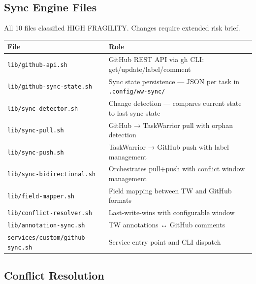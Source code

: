 \documentclass[
]{article}
\newcounter{none} %
\begin{document}
\subsection{Sync Engine Files}\label{sync-engine-files}

All 10 files classified HIGH FRAGILITY. Changes require extended risk
brief.

{\def\LTcaptype{none} %
\begin{longtable}[]{@{}
  >{\raggedright\arraybackslash}p{}
  >{\raggedright\arraybackslash}p{}@{}}
\toprule\noalign{}
\begin{minipage}[b]{\linewidth}\raggedright
File
\end{minipage} & \begin{minipage}[b]{\linewidth}\raggedright
Role
\end{minipage} \\
\midrule\noalign{}
\endhead
\bottomrule\noalign{}
\endlastfoot
\texttt{lib/github-api.sh} & GitHub REST API via gh CLI:
get/update/label/comment \\
\texttt{lib/github-sync-state.sh} & Sync state persistence --- JSON per
task in \texttt{.config/ww-sync/} \\
\texttt{lib/sync-detector.sh} & Change detection --- compares current
state to last sync state \\
\texttt{lib/sync-pull.sh} & GitHub → TaskWarrior pull with orphan
detection \\
\texttt{lib/sync-push.sh} & TaskWarrior → GitHub push with label
management \\
\texttt{lib/sync-bidirectional.sh} & Orchestrates pull+push with
conflict window management \\
\texttt{lib/field-mapper.sh} & Field mapping between TW and GitHub
formats \\
\texttt{lib/conflict-resolver.sh} & Last-write-wins with configurable
window \\
\texttt{lib/annotation-sync.sh} & TW annotations ↔ GitHub comments \\
\texttt{services/custom/github-sync.sh} & Service entry point and CLI
dispatch \\
\end{longtable}
}

\subsection{Conflict Resolution}\label{conflict-resolution}
\end{document}
